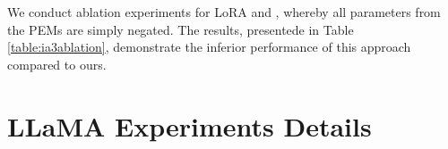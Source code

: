 We conduct ablation experiments for LoRA and \ia, whereby all parameters from the PEMs are simply negated. The results, presentede in Table \ref{table:ia3ablation}, demonstrate the inferior performance of this approach compared to ours.

\begin{table}[!ht]
\caption{The output toxicity and language modeling perplexity (PPL) for ablation analysis. }
\label{table:ia3ablation}
\centering
{}
\end{table}


\section{LLaMA Experiments Details}
\label{sec:apx_llama}


